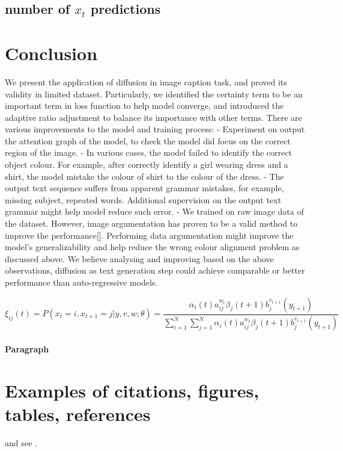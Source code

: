 \documentclass{article}
\begin{document}
\subsection{number of $x_t$ predictions}


\section{Conclusion}
We present the application of diffusion in image caption task, and proved its validity in limited dataset. Particularly, we identified the certainty term to be an important term in loss function to help model converge, and introduced the adaptive ratio adjustment to balance its importance with other terms. There are various improvements to the model and training process:
- Experiment on output the attention graph of the model, to check the model did focus on the correct region of the image.
- In various cases, the model failed to identify the correct object colour. For example, after correctly identify a girl wearing dress and a shirt, the model mistake the colour of shirt to the colour of the dress. 
- The output text sequence suffers from apparent grammar mistakes, for example, missing subject, repeated words. Additional supervision on the output text grammar might help model reduce such error.
- We trained on raw image data of the dataset. However, image argumentation has proven to be a valid method to improve the performance[]. Performing data argumentation might improve the model's generalizability and help reduce the wrong colour alignment problem as discussed above. 
We believe analysing and improving based on the above observations, diffusion as text generation step could achieve comparable or better performance than auto-regressive models. 




\begin{equation}
\xi _{ij}(t)=P(x_{t}=i,x_{t+1}=j|y,v,w;\theta)= {\frac {\alpha _{i}(t)a^{w_t}_{ij}\beta _{j}(t+1)b^{v_{t+1}}_{j}(y_{t+1})}{\sum _{i=1}^{N} \sum _{j=1}^{N} \alpha _{i}(t)a^{w_t}_{ij}\beta _{j}(t+1)b^{v_{t+1}}_{j}(y_{t+1})}}
\end{equation}


\paragraph{Paragraph}
\lipsum[7]

\section{Examples of citations, figures, tables, references}
\label{sec:others}
\lipsum[8] \cite{kour2014real,kour2014fast} and see \cite{hadash2018estimate}.
\end{document}

